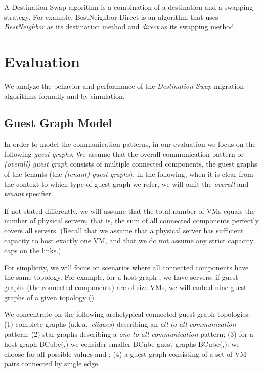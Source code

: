 \documentclass[conference]{IEEEtran}
\def\BC#1#2{BCube(#1,#2)}
\newcommand{\BestNeighborD}{{\sc BestNeighbor-Direct} }
\begin{document}
A Destination-Swap algorithm is a combination of a destination and a swapping strategy. For example, \BestNeighborD is an algorithm that uses \emph{BestNeighbor} as its destination method and \emph{direct} as its swapping method.


\section{Evaluation}\label{sec:simulations}

We analyze the behavior and performance of the \emph{Destination-Swap} migration algorithms formally and
by simulation.

\subsection{Guest Graph Model}

In order to model the communication patterns, in our evaluation we focus on the following \emph{guest graphs}.
We assume that the overall communication pattern or \emph{(overall) guest graph} consists of multiple connected components, the guest graphs of the tenants
(the \emph{(tenant) guest graphs}); in the following, when it is clear from the context to which type of guest graph we refer, we will omit the \emph{overall} and \emph{tenant}
specifier.

If not stated differently, we will assume that the total number of VMs equals the number of physical servers, that is,
the sum of all connected components perfectly covers all servers. (Recall that we assume that a physical server has sufficient capacity to host exactly one VM, and that
we do not assume any strict capacity caps on the links.)

For simplicity, we will focus on scenarios where all connected components have the same topology.
For example, for a host graph , we have  servers; if guest graphs (the connected components)
are of size  VMs, we will embed nine guest graphs of a given topology ().

We concentrate on the following archetypical connected guest graph topologies: (1) complete graphs (a.k.a.~\emph{cliques}) describing
an \emph{all-to-all communication} pattern; (2)
star graphs describing a \emph{one-to-all communication} pattern; (3) for a host graph \BC{}{}
we consider smaller BCube guest graphs \BC{}{}:
we choose  for all possible values  and ; (4) a guest graph consisting of a set of VM pairs connected by single edge.
\end{document}
